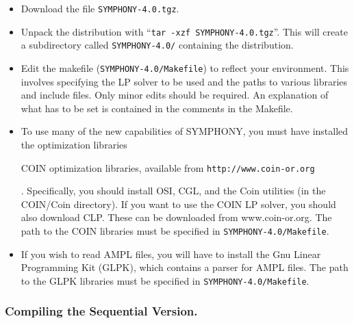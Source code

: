 \begin{itemize}

        \item Download the file {\tt SYMPHONY-4.0.tgz}.

        \item Unpack the distribution with ``{\tt tar -xzf
        SYMPHONY-4.0.tgz}''. This will create a subdirectory called
        {\tt SYMPHONY-4.0/} containing the distribution.
        
        \item Edit the makefile ({\tt SYMPHONY-4.0/Makefile}) to reflect your
              environment. This involves specifying the LP solver to be used
              and the paths to various libraries and include files. Only minor
              edits should be required. An explanation of what has to be set
              is contained in the comments in the Makefile. 

        \item To use many of the new capabilities of SYMPHONY, you must have
	      installed the
	      \emph{}
	      optimization libraries 
	      \begin{latexonly} 
	      COIN optimization libraries, available from 
	      \texttt{http://www.coin-or.org}
	      \end{latexonly}. 
	      Specifically, you should install OSI, CGL, and
	      the Coin utilities (in the COIN/Coin directory). If you want to
	      use the COIN LP solver, you should also download CLP. These can
	      be downloaded from www.coin-or.org. The path to the COIN
	      libraries must be specified in \texttt{SYMPHONY-4.0/Makefile}.

        \item If you wish to read AMPL files, you will have to install the Gnu
	      Linear Programming Kit (GLPK), which contains a parser for AMPL
	      files. The path to the GLPK libraries must be specified in
	      \texttt{SYMPHONY-4.0/Makefile}.

\end{itemize}
        
\subsubsection{Compiling the Sequential Version.}

